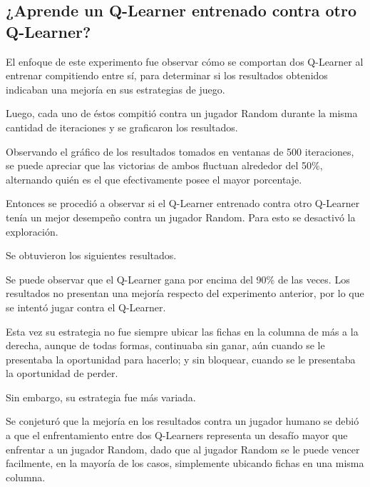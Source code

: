 \subsection{¿Aprende un Q-Learner entrenado contra otro Q-Learner?}

El enfoque de este experimento fue observar cómo se comportan dos Q-Learner al entrenar compitiendo entre sí, para determinar si los resultados obtenidos indicaban una mejoría en sus estrategias de juego.

Luego, cada uno de éstos compitió contra un jugador Random durante la misma cantidad de iteraciones y se graficaron los resultados.



Observando el gráfico de los resultados tomados en ventanas de 500 iteraciones, se puede apreciar que las victorias de ambos fluctuan alrededor del 50\%, alternando quién es el que efectivamente posee el mayor porcentaje.

Entonces se procedió a observar si el Q-Learner entrenado contra otro Q-Learner tenía un mejor desempeño contra un jugador Random. Para esto se desactivó la exploración.

Se obtuvieron los siguientes resultados.



Se puede observar que el Q-Learner gana por encima del 90\% de las veces. Los resultados no presentan una mejoría respecto del experimento anterior, por lo que se intentó jugar contra el Q-Learner.

Esta vez su estrategia no fue siempre ubicar las fichas en la columna de más a la derecha, aunque de todas formas, continuaba sin ganar, aún cuando se le presentaba la oportunidad para hacerlo; y sin bloquear, cuando se le presentaba la oportunidad de perder. 

Sin embargo, su estrategia fue más variada.

Se conjeturó que la mejoría en los resultados contra un jugador humano se debió a que el enfrentamiento entre dos Q-Learners representa un desafío mayor que enfrentar a un jugador Random, dado que al jugador Random se le puede vencer facilmente, en la mayoría de los casos, simplemente ubicando fichas en una misma columna.
